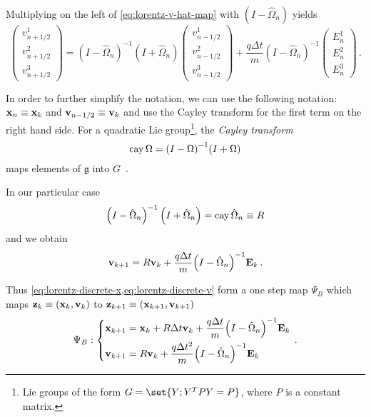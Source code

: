\documentclass[12pt, class=report, crop=false]{standalone}
\begin{document}
Multiplying on the left of \cref{eq:lorentz-v-hat-map} with
\(\left(I - \hat{\Omega}_{n}\right)\) yields
\[
\begin{pmatrix}
  v_{n+1/2}^1 \\
  v_{n+1/2}^2 \\
  v_{n+1/2}^3
\end{pmatrix}
=
{\left(I - \hat{\Omega}_{n}\right)}^{-1} \left(I + \hat{\Omega}_{n}\right)
\begin{pmatrix}
  v_{n-1/2}^1 \\
  v_{n-1/2}^2 \\
  v_{n-1/2}^3
\end{pmatrix}
+ \frac{q \Delta t}{m} {\left(I - \hat{\Omega}_{n}\right)}^{-1}
\begin{pmatrix}
  E_n^1 \\
  E_n^2 \\
  E_n^3
\end{pmatrix}\,.
\]

In order to further simplify the notation, we can use the following notation:
\(\vb{x}_n \equiv \vb{x}_k\) and \(\vb{v}_{n-1/2} \equiv \vb{v}_k\)
and use the Cayley transform
for the first term on the right hand side.
For a quadratic Lie group\footnote{Lie groups of the form
\(G = \set{Y ; Y^T P Y = P}\), where \(P\) is a constant
matrix.}, the \emph{Cayley transform}
\[
\operatorname{cay}{\Omega} = {(I-\Omega)}^{-1} (I+\Omega)
\]
maps elements of \(\mathfrak{g}\) into \(G\)~\autocite[128]{hairer_geometricnumerical_2006}.

In our particular case
\[
{\left(I - \hat{\Omega}_{n}\right)}^{-1} \left(I + \hat{\Omega}_{n}\right) = \operatorname{cay}{\hat{\Omega}_{n}} \equiv R
\]
and we obtain
\[
\vb{v}_{k+1} = R \vb{v}_k + \frac{q \Delta t}{m} {\left(I - \hat{\Omega}_{n}\right)}^{-1} \vb{E}_k\,.
\]

Thus \cref{eq:lorentz-discrete-x,eq:lorentz-discrete-v} form a
one step map \(\Psi_B\) which maps \(\vb{z}_k \equiv (\vb{x}_k, \vb{v}_k)\)
to \(\vb{z}_{k+1} \equiv (\vb{x}_{k+1}, \vb{v}_{k+1})\)
\begin{equation*}
  \Psi_B: \left\{
  \begin{aligned}
    \vb{x}_{k+1} &= \vb{x}_k + R \Delta t\vb{v}_k + \frac{q \Delta t}{m} {\left(I - \hat{\Omega}_{n}\right)}^{-1} \vb{E}_k \\
    \vb{v}_{k+1} &= R \vb{v}_k + \frac{q \Delta t^2}{m} {\left(I - \hat{\Omega}_{n}\right)}^{-1} \vb{E}_k
  \end{aligned}
\right.\,.
\end{equation*}
\end{document}
